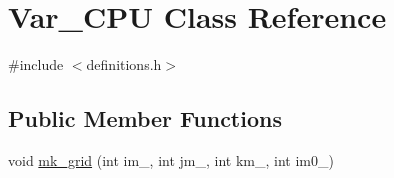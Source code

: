 \hypertarget{classVar__CPU}{}\section{Var\+\_\+\+C\+PU Class Reference}
\label{classVar__CPU}


{\ttfamily \#include $<$definitions.\+h$>$}

\subsection*{Public Member Functions}
\begin{DoxyCompactItemize}
\item 
void \hyperlink{classVar__CPU_a61a81776421804e9dc2a8e2c3b7cc2de}{mk\+\_\+grid} (int im\+\_\+, int jm\+\_\+, int km\+\_\+, int im0\+\_\+)
\end{DoxyCompactItemize}
